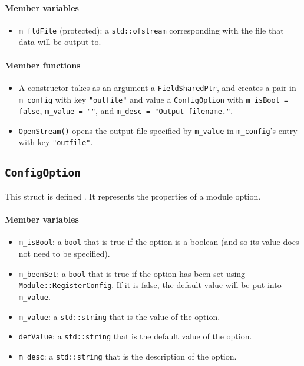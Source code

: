 \paragraph{Member variables}

\begin{itemize}

\item \verb+m_fldFile+ (protected): a \verb+std::ofstream+ corresponding with the file that data will be output to. 

\end{itemize}

\paragraph{Member functions}

\begin{itemize}

\item A constructor takes as an argument a \verb+FieldSharedPtr+, and creates a pair in \verb+m_config+ with key \verb+"outfile"+ and value a \verb+ConfigOption+ with \verb+m_isBool = false+, \verb+m_value = ""+, and \verb+m_desc = "Output filename."+.

\item \verb+OpenStream()+ opens the output file specified by \verb+m_value+ in \verb+m_config+'s entry with key \verb+"outfile"+.

\end{itemize}


\subsection{\texttt{ConfigOption}}
This struct is defined . It represents the properties of a module option.

\paragraph{Member variables}

\begin{itemize}

\item \verb+m_isBool+: a \verb+bool+ that is true if the option is a boolean (and so its value does not need to be specified).

\item \verb+m_beenSet+: a \verb+bool+ that is true if the option has been set using \verb+Module::RegisterConfig+. If it is false, the default value will be put into \verb+m_value+.

\item \verb+m_value+: a \verb+std::string+ that is the value of the option.

\item \verb+defValue+: a \verb+std::string+ that is the default value of the option.

\item \verb+m_desc+: a \verb+std::string+ that is the description of the option.

\end{itemize}

